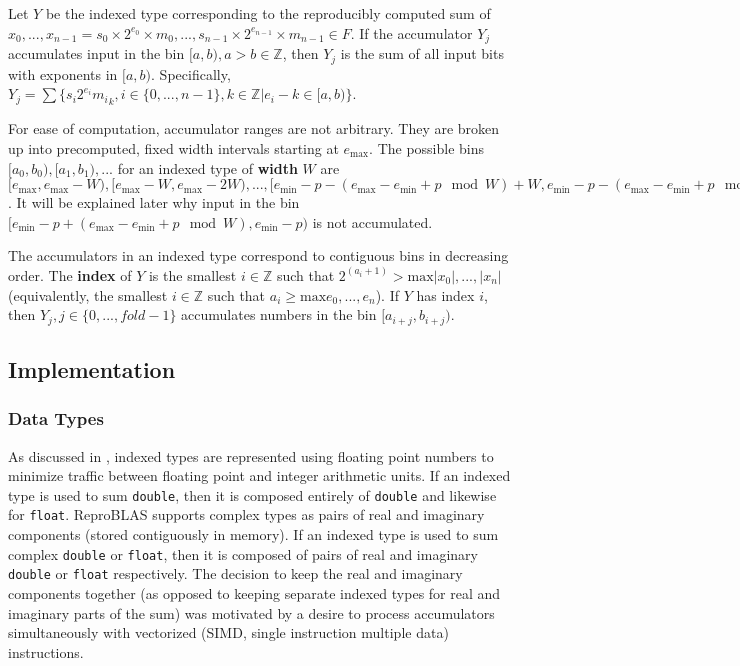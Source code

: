 \documentclass[12pt]{article}
\providecommand{\Z}{\ensuremath{\mathbb{Z}}}
\providecommand{\min}{\ensuremath{\text{min}}}
\providecommand{\max}{\ensuremath{\text{max}}}
\theoremstyle{plain}
\begin{document}
    Let $Y$ be the indexed type corresponding to the reproducibly computed sum of $x_0, ..., x_{n - 1} = s_0 \times 2^{e_0} \times m_0, ..., s_{n - 1} \times 2^{e_{n - 1}} \times m_{n - 1} \in F$.
    If the accumulator $Y_j$ accumulates input in the bin $[a, b), a > b \in \Z$, then $Y_j$ is the sum of all input bits with exponents in $[a, b)$. Specifically, $Y_j = \sum \{s_i2^{e_i}{m_i}_k, i \in \{0, ..., n - 1\}, k \in \Z | e_i - k \in [a, b)\}$.

    For ease of computation, accumulator ranges are not arbitrary. They are broken up into precomputed, fixed width intervals starting at $e_{\max}$. The possible bins $[a_0, b_0), [a_1, b_1), ...$ for an indexed type of \textbf{width} $W$ are $[e_{\max}, e_{\max} - W), [e_{\max} - W, e_{\max} - 2W), ..., [e_{\min} - p - (e_{\max} - e_{\min} + p \mod W) + W, e_{\min} - p - (e_{\max} - e_{\min} + p \mod W))$. It will be explained later why input in the bin $[e_{\min} - p + (e_{\max} - e_{\min} + p \mod W), e_{\min} - p)$ is not accumulated.

    The accumulators in an indexed type correspond to contiguous bins in decreasing order. The \textbf{index} of $Y$ is the smallest $i \in \Z$ such that $2^(a_i + 1) > \max{|x_0|, ..., |x_n|}$ (equivalently, the smallest $i \in \Z$ such that $a_i \geq \max{e_0, ..., e_n}$). If $Y$ has index $i$, then $Y_j, j \in \{0, ..., fold - 1\}$ accumulates numbers in the bin $[a_{i + j}, b_{i + j})$.
  \subsection{Implementation}
    \subsubsection{Data Types}
      As discussed in \cite{repsum}, indexed types are represented using floating point numbers to minimize traffic between floating point and integer arithmetic units. If an indexed type is used to sum \verb|double|, then it is composed entirely of \verb|double| and likewise for \verb|float|. ReproBLAS supports complex types as pairs of real and imaginary components (stored contiguously in memory). If an indexed type is used to sum complex \verb|double| or \verb|float|, then it is composed of pairs of real and imaginary \verb|double| or \verb|float| respectively. The decision to keep the real and imaginary components together (as opposed to keeping separate indexed types for real and imaginary parts of the sum) was motivated by a desire to process accumulators simultaneously with vectorized (SIMD, single instruction multiple data) instructions.
\end{document}
